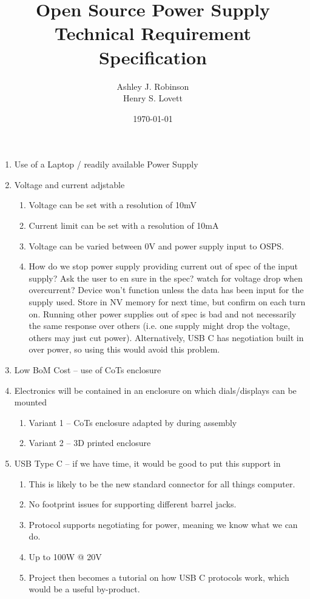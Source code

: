 \documentclass[12pt,a4paper]{article}
\title{Open Source Power Supply\\ Technical Requirement Specification}
\author{Ashley J. Robinson \\ Henry S. Lovett}
\date{\today}
\begin{document}
\maketitle

\begin{enumerate}

\item Use of a Laptop / readily available Power Supply
\item Voltage and current adjstable
	\begin{enumerate}
	\item Voltage can be set with a resolution of 10mV
	\item Current limit can be set with a resolution of 10mA
	\item Voltage can be varied between 0V and power supply input to OSPS.
	\item How do we stop power supply providing current out of spec of the input supply? Ask the user to en sure in the spec? watch for voltage drop when overcurrent? Device won't function unless the data has been input for the supply used. Store in NV memory for next time, but confirm on each turn on. Running other power supplies out of spec is bad and not necessarily the same response over others (i.e. one supply might drop the voltage, others may just cut power). Alternatively, USB C has negotiation built in over power, so using this would avoid this problem. 
	\end{enumerate}
\item Low BoM Cost – use of CoTs enclosure
\item Electronics will be contained in an enclosure on which dials/displays can be mounted
	\begin{enumerate}
	\item Variant 1 – CoTs enclosure adapted by during assembly
	\item Variant 2 – 3D printed enclosure
	\end{enumerate}
\item  USB Type C – if we have time, it would be good to put this support in
	\begin{enumerate}
	\item This is likely to be the new standard connector for all things computer.
	\item No footprint issues for supporting different barrel jacks.
	\item Protocol supports negotiating for power, meaning we know what we can do. 
	\item Up to 100W @ 20V
	\item Project then becomes a tutorial on how USB C protocols work, which would be a useful by-product. 
	\end{enumerate}
\end{enumerate}
\end{document}
